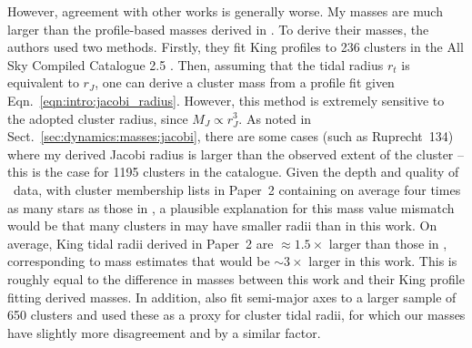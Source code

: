 However, agreement with other works is generally worse. My masses are much larger than the profile-based masses derived in \cite{piskunov_tidal_2008}. To derive their masses, the authors used two methods. Firstly, they fit King profiles to 236 clusters in the All Sky Compiled Catalogue 2.5 \cite{kharchenko_allsky_compiled_2001}. Then, assuming that the \cite{king_structure_star_1962} tidal radius $r_t$ is equivalent to $r_J$, one can derive a cluster mass from a profile fit given Eqn.~\ref{eqn:intro:jacobi_radius}. However, this method is extremely sensitive to the adopted cluster radius, since $M_J \propto r_J^3$. As noted in Sect.~\ref{sec:dynamics:masses:jacobi}, there are some cases (such as Ruprecht~134) where my derived Jacobi radius is larger than the observed extent of the cluster -- this is the case for 1195 clusters in the catalogue. Given the depth and quality of \gaia\ data, with cluster membership lists in Paper~2 containing on average four times as many stars as those in \cite{kharchenko_global_2013}, a plausible explanation for this mass value mismatch would be that many clusters in \cite{piskunov_tidal_2008} may have smaller radii than in this work. On average, King tidal radii derived in Paper~2 are $\approx 1.5\times$ larger than those in \cite{piskunov_tidal_2008}, corresponding to mass estimates that would be $\sim 3\times$ larger in this work. This is roughly equal to the difference in masses between this work and their King profile fitting derived masses. In addition, \cite{piskunov_tidal_2008} also fit semi-major axes to a larger sample of 650 clusters and used these as a proxy for cluster tidal radii, for which our masses have slightly more disagreement and by a similar factor.


